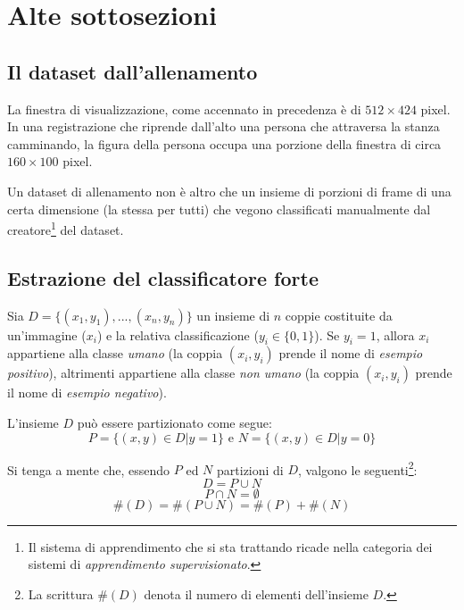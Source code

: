 \section{Alte sottosezioni}
\label{sec:Alte sottosezioni}
\subsection{Il dataset dall'allenamento} %
\label{sub:il_dataset_dall_allenamento}
La finestra di visualizzazione, come accennato in precedenza è di $512 \times 424$ pixel. In una registrazione che riprende dall'alto una persona che attraversa la stanza camminando, la figura della persona occupa una porzione della finestra di circa $160 \times 100$ pixel.

Un dataset di allenamento non è altro che un insieme di porzioni di frame di una certa dimensione (la stessa per tutti) che vegono classificati manualmente dal creatore\footnote{Il sistema di apprendimento che si sta trattando ricade nella categoria dei sistemi di \emph{apprendimento supervisionato}.} del dataset.


\subsection{Estrazione del classificatore forte} %
\label{sub:estrazione_del_classificatore_forte}
Sia $D = \{(x_1, y_1), ..., (x_n, y_n)\}$ un insieme di $n$ coppie costituite da un'immagine ($x_i$) e la relativa classificazione ($y_i \in \{ 0, 1 \}$). Se $y_i = 1$, allora $x_i$ appartiene alla classe \emph{umano} (la coppia $(x_i, y_i)$ prende il nome di \emph{esempio positivo}), altrimenti appartiene alla classe \emph{non umano} (la coppia $(x_i, y_i)$ prende il nome di \emph{esempio negativo}).

L'insieme $D$ può essere partizionato come segue:
$$P = \{(x, y) \in D | y = 1\} \text{ e } N = \{(x,y) \in D | y = 0\}$$

Si tenga a mente che, essendo $P$ ed $N$ partizioni di $D$, valgono le seguenti\footnote{La scrittura $\#(D)$ denota il numero di elementi dell'insieme $D$.}:
\begin{equation}
    D = P \cup N
\end{equation}
\begin{equation}
    P \cap N = \emptyset
\end{equation}
\begin{equation}
    \#(D) = \#(P \cup N) = \#(P) + \#(N)
\end{equation}

